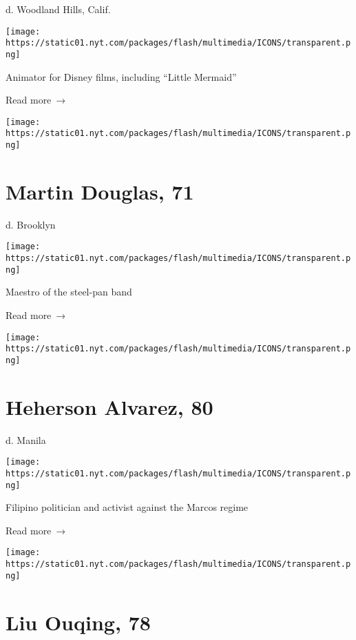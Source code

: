 d. Woodland Hills, Calif.

\texttt{[image: https://static01.nyt.com/packages/flash/multimedia/ICONS/transparent.png]}

Animator for Disney films, including ``Little Mermaid''

 Read more~→

\href{https://www.nytimes.com/2020/04/21/obituaries/martin-douglas-dead-coronavirus.html}{}

\texttt{[image: https://static01.nyt.com/packages/flash/multimedia/ICONS/transparent.png]}

\hypertarget{martin-douglas-71}{%
\section{Martin Douglas, 71}\label{martin-douglas-71}}

d. Brooklyn

\texttt{[image: https://static01.nyt.com/packages/flash/multimedia/ICONS/transparent.png]}

Maestro of the steel-pan band

 Read more~→

\href{https://www.nytimes.com/2020/04/21/obituaries/heherson-alvarez-coronavirus-dead.html}{}

\texttt{[image: https://static01.nyt.com/packages/flash/multimedia/ICONS/transparent.png]}

\hypertarget{heherson-alvarez-80}{%
\section{Heherson Alvarez, 80}\label{heherson-alvarez-80}}

d. Manila

\texttt{[image: https://static01.nyt.com/packages/flash/multimedia/ICONS/transparent.png]}

Filipino politician and activist against the Marcos regime

 Read more~→

\href{https://www.nytimes.com/2020/04/21/obituaries/ouqing-liu-coronavirus-dead.html}{}

\texttt{[image: https://static01.nyt.com/packages/flash/multimedia/ICONS/transparent.png]}

\hypertarget{liu-ouqing-78}{%
\section{Liu Ouqing, 78}\label{liu-ouqing-78}}

